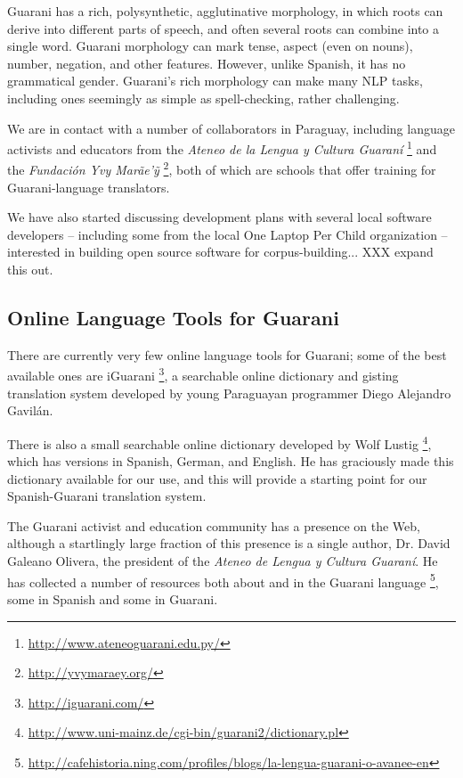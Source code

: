Guarani has a rich, polysynthetic, agglutinative morphology, in which roots can
derive into different parts of speech, and often several roots can combine into
a single word. Guarani morphology can mark tense, aspect (even on nouns),
number, negation, and other features. However, unlike Spanish, it has no
grammatical gender.  Guarani's rich morphology can make many NLP tasks,
including ones seemingly as simple as spell-checking, rather challenging.

We are in contact with a number of collaborators in Paraguay, including
language activists and educators from the \emph{Ateneo de la Lengua y Cultura
Guaraní} \footnote{\url{http://www.ateneoguarani.edu.py/}} and the
\emph{Fundación Yvy Marãe'{\~y}} \footnote{\url{http://yvymaraey.org/}},
both of which are schools that offer training for Guarani-language translators.

We have also started discussing development plans with several local software
developers -- including some from the local One Laptop Per Child organization
-- interested in building open source software for corpus-building... XXX
expand this out.

\subsection{Online Language Tools for Guarani}
There are currently very few online language tools for Guarani; some of the
best available ones are iGuarani \footnote{\url{http://iguarani.com/}}, a
searchable online dictionary and gisting translation system developed by young
Paraguayan programmer Diego Alejandro Gavilán.

There is also a small searchable online dictionary developed by Wolf Lustig
\footnote{\url{http://www.uni-mainz.de/cgi-bin/guarani2/dictionary.pl}},
which has versions in Spanish, German, and English. He has graciously made this
dictionary available for our use, and this will provide a starting point for
our Spanish-Guarani translation system.

The Guarani activist and education community has a presence on the Web,
although a startlingly large fraction of this presence is a single author,
Dr. David Galeano Olivera, the president of the \emph{Ateneo de Lengua y
Cultura Guaraní}. He has collected a number of resources both about and in the
Guarani language
\footnote{\url{http://cafehistoria.ning.com/profiles/blogs/la-lengua-guarani-o-avanee-en}},
some in Spanish and some in Guarani.
